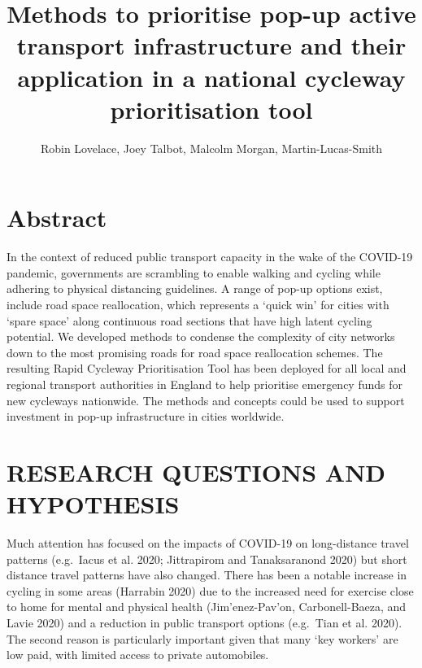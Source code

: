 \documentclass[
]{article}
\title{Methods to prioritise pop-up active transport infrastructure and their application in a national cycleway prioritisation tool}
\author{Robin Lovelace, Joey Talbot, Malcolm Morgan, Martin-Lucas-Smith}
\date{}
\begin{document}
\maketitle

{
\setcounter{tocdepth}{2}
\tableofcontents
}
\hypertarget{abstract}{%
\section{Abstract}\label{abstract}}

In the context of reduced public transport capacity in the wake of the COVID-19 pandemic, governments are scrambling to enable walking and cycling while adhering to physical distancing guidelines.
A range of pop-up options exist, include road space reallocation, which represents a `quick win' for cities with `spare space' along continuous road sections that have high latent cycling potential.
We developed methods to condense the complexity of city networks down to the most promising roads for road space reallocation schemes.
The resulting Rapid Cycleway Prioritisation Tool has been deployed for all local and regional transport authorities in England to help prioritise emergency funds for new cycleways nationwide.
The methods and concepts could be used to support investment in pop-up infrastructure in cities worldwide.

\hypertarget{research-questions-and-hypothesis}{%
\section{RESEARCH QUESTIONS AND HYPOTHESIS}\label{research-questions-and-hypothesis}}

Much attention has focused on the impacts of COVID-19 on long-distance travel patterns (e.g.~Iacus et al. 2020; Jittrapirom and Tanaksaranond 2020) but short distance travel patterns have also changed.
There has been a notable increase in cycling in some areas (Harrabin 2020) due to the increased need for exercise close to home for mental and physical health (Jim\a'enez-Pav\a'on, Carbonell-Baeza, and Lavie 2020) and a reduction in public transport options (e.g.~Tian et al. 2020).
The second reason is particularly important given that many `key workers' are low paid, with limited access to private automobiles.
\end{document}

